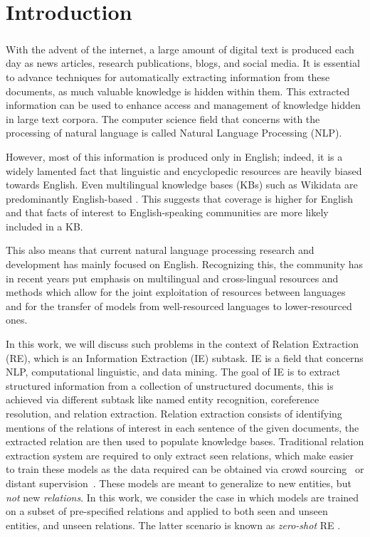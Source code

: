 \chapter{Introduction}
\paragraph{}

With the advent of the internet, a large amount of digital text is produced each day as news articles, research publications, blogs, and social media. It is essential to advance techniques for automatically extracting information from these documents, as much valuable knowledge is hidden within them. This extracted information can be used to enhance access and management of knowledge hidden in large text corpora. The computer science field that concerns with the processing of natural language is called Natural Language Processing (NLP). 

However, most of this information is produced only in English; indeed, it is a widely lamented fact that linguistic and encyclopedic resources are heavily biased towards English. Even multilingual knowledge bases (KBs) such as Wikidata \citep{vwikidata} are predominantly English-based \citep{Kaffee:Simperl:18}. This suggests that coverage is higher for English and that facts of interest to English-speaking communities are more likely included in a KB.

This also means that current natural language processing research and development has mainly focused on English. Recognizing this, the community has in recent years put emphasis on multilingual and cross-lingual resources and methods which allow for the joint exploitation of resources between languages and for the transfer of models from well-resourced languages to lower-resourced ones.

In this work, we will discuss such problems in the context of Relation Extraction (RE), which is an Information Extraction (IE) subtask. IE is a field that concerns NLP, computational linguistic, and data mining. The goal of IE is to extract structured information from a collection of unstructured documents, this is achieved via different subtask like named entity recognition, coreference resolution, and relation extraction. Relation extraction consists of identifying mentions of the relations of interest in each sentence of the given documents, the extracted relation are then used to populate knowledge bases. Traditional relation extraction system are required to only extract seen relations, which make easier to train these models as the data required can be obtained via crowd sourcing~\citep{liu-etal-2016-effective} or distant supervision~\citep{hoffmann-etal-2011-knowledge}. These models are meant to generalize to new entities, but {\em not} new {\em relations}. In this work, we consider the  case in which models are trained on a subset of pre-specified relations and applied to both seen and unseen entities, and unseen relations. The latter scenario is known as {\em zero-shot} RE \citep{rocktaschel2015injecting}.

